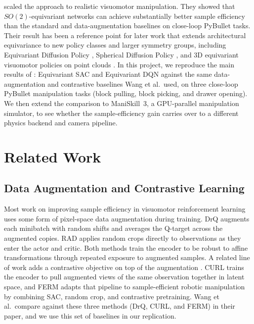 \documentclass[letterpaper]{article}
\begin{document}
\citet{wang2022so2} scaled the approach to realistic visuomotor manipulation. They showed that $SO(2)$-equivariant networks can achieve substantially better sample efficiency than the standard and data-augmentation baselines on close-loop PyBullet tasks. Their result has been a reference point for later work that extends architectural equivariance to new policy classes and larger symmetry groups, including Equivariant Diffusion Policy \citep{wang2024diffusion}, Spherical Diffusion Policy \citep{spherical2025}, and 3D equivariant visuomotor policies on point clouds \citep{equivariant3d2025}. In this project, we reproduce the main results of \citet{wang2022so2}: Equivariant SAC and Equivariant DQN against the same data-augmentation and contrastive baselines Wang et al.\ used, on three close-loop PyBullet manipulation tasks (block pulling, block picking, and drawer opening). We then extend the comparison to ManiSkill~3, a GPU-parallel manipulation simulator, to see whether the sample-efficiency gain carries over to a different physics backend and camera pipeline.

\section{Related Work}

\subsection{Data Augmentation and Contrastive Learning}
Most work on improving sample efficiency in visuomotor reinforcement learning uses some form of pixel-space data augmentation during training. DrQ \citep{kostrikov2020drq} augments each minibatch with random shifts and averages the Q-target across the augmented copies. RAD \citep{laskin2020rad} applies random crops directly to observations as they enter the actor and critic. Both methods train the encoder to be robust to affine transformations through repeated exposure to augmented samples. A related line of work adds a contrastive objective on top of the augmentation \citep{oord2018cpc}. CURL \citep{laskin2020curl} trains the encoder to pull augmented views of the same observation together in latent space, and FERM \citep{zhan2020ferm} adapts that pipeline to sample-efficient robotic manipulation by combining SAC, random crop, and contrastive pretraining. Wang et al.\ compare against these three methods (DrQ, CURL, and FERM) in their paper, and we use this set of baselines in our replication.
\end{document}
